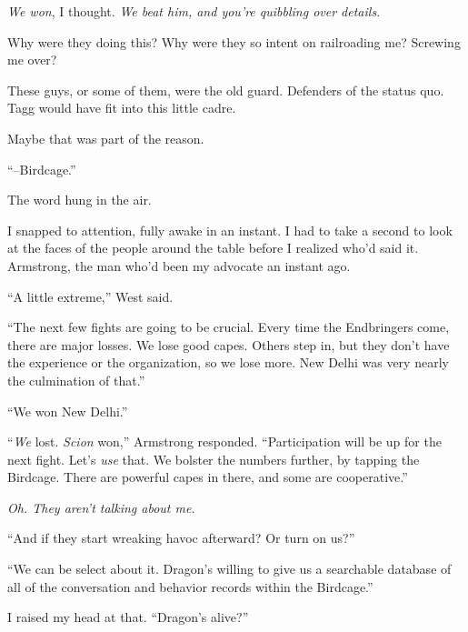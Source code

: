 \emph{We won}, I thought.  \emph{We beat him, and you're quibbling over details}.



Why were they doing this?  Why were they so intent on railroading me?  Screwing me over?



These guys, or some of them, were the old guard.  Defenders of the status quo.  Tagg would have fit into this little cadre.



Maybe that was part of the reason.



``--Birdcage.''



The word hung in the air.



I snapped to attention, fully awake in an instant.  I had to take a second to look at the faces of the people around the table before I realized who'd said it.  Armstrong, the man who'd been my advocate an instant ago.



``A little extreme,'' West said.



``The next few fights are going to be crucial.  Every time the Endbringers come, there are major losses.  We lose good capes.  Others step in, but they don't have the experience or the organization, so we lose more.  New Delhi was very nearly the culmination of that.''



``We won New Delhi.''



``\emph{We} lost.  \emph{Scion} won,'' Armstrong responded.  ``Participation will be up for the next fight.  Let's \emph{use} that.  We bolster the numbers further, by tapping the Birdcage.  There are powerful capes in there, and some are cooperative.''



\emph{Oh.  They aren't talking about me}.



``And if they start wreaking havoc afterward?  Or turn on us?''



``We can be select about it.  Dragon's willing to give us a searchable database of all of the conversation and behavior records within the Birdcage.''



I raised my head at that.  ``Dragon's alive?''



